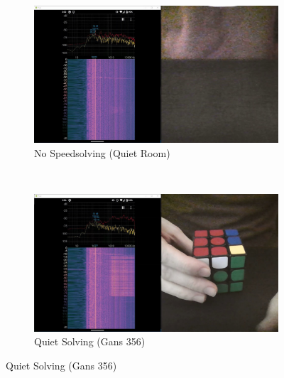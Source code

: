 \begin{figure}
    \centering
    \caption{Background Noise of a Quiet Room while Speedsolving}
    \label{fig:signal-to-noise-ratio}
    \begin{subfigure}{\textwidth}
        \centering
        \caption{No Speedsolving (Quiet Room)}
        \label{fig:signal-to-noise-ratio-silent}
        \includegraphics[width=\linewidth]{Figures/4 Protocol Design/Signal to Noise Ratio/silent_background_noise.jpg}
        \vspace*{2mm}
    \end{subfigure}\\
    \begin{subfigure}{\textwidth}
        \centering
        \caption{Quiet Solving (Gans 356)}
        \label{fig:signal-to-noise-ratio-356}
        \includegraphics[width=\linewidth]{Figures/4 Protocol Design/Signal to Noise Ratio/356_background_noise.jpg}
        \vspace*{2mm}
    \end{subfigure}
\end{figure}
